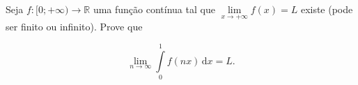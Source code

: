 Seja \(f\colon [0;+\infty)\to \mathbb R\) uma função contínua tal que \(\lim\limits_{x\to +\infty} f(x)=L\) existe (pode ser finito ou infinito). Prove que 

\[
\lim\limits_{n\to\infty}\int\limits_0^{1}f(nx)\,\mathrm{d}x=L.
\]
